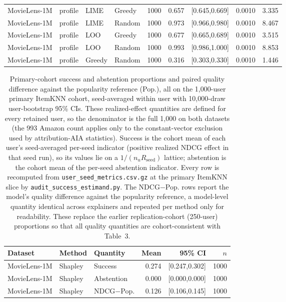 \begin{table}[!htbp]
\begin{tabular}{@{}llllrrrrr@{}}
MovieLens-1M & profile & LIME & Greedy & 1000 & 0.657 & [0.645,0.669] & 0.0010 & 3.335 \\
MovieLens-1M & profile & LIME & Random & 1000 & 0.973 & [0.966,0.980] & 0.0010 & 8.467 \\
MovieLens-1M & profile & LOO & Greedy & 1000 & 0.677 & [0.665,0.689] & 0.0010 & 3.515 \\
MovieLens-1M & profile & LOO & Random & 1000 & 0.993 & [0.986,1.000] & 0.0010 & 8.853 \\
MovieLens-1M & profile & Greedy & Random & 1000 & 0.316 & [0.303,0.330] & 0.0010 & 1.446 \\
\bottomrule
\end{tabular}
\end{table}

\begin{table}[!htbp]\centering\scriptsize\setlength{\tabcolsep}{3pt}
\caption{Primary-cohort success and abstention proportions and paired
quality difference against the popularity reference (Pop.), all on the
1,000-user primary ItemKNN cohort, seed-averaged within user with
10,000-draw user-bootstrap 95\% CIs. These realized-effect quantities are
defined for every retained user, so the denominator is the full 1,000 on both
datasets (the 993 Amazon count applies only to the constant-vector exclusion
used by attribution-AIA statistics). Success is the cohort mean of each user's
seed-averaged per-seed indicator (positive realized NDCG effect in that seed run), so
its values lie on a $1/(n_uR_{\mathrm{seed}})$ lattice; abstention is the cohort
mean of the per-seed abstention indicator. Every row is recomputed from
\texttt{user\_seed\_metrics.csv.gz} at the primary ItemKNN slice by
\texttt{audit\_success\_estimand.py}. The NDCG$-$Pop. rows report the model's quality
difference against the popularity reference, a model-level quantity identical
across explainers and repeated per method only for readability. These replace
the earlier replication-cohort (250-user) proportions so that all quality
quantities are cohort-consistent with Table~3.}
\label{tab:prop-quality}
\begin{tabular}{@{}lllrrr@{}}
\toprule
Dataset & Method & Quantity & Mean & 95\% CI & $n$ \\
\midrule
MovieLens-1M & Shapley & Success & 0.274 & [0.247,0.302] & 1000 \\
MovieLens-1M & Shapley & Abstention & 0.000 & [0.000,0.000] & 1000 \\
MovieLens-1M & Shapley & NDCG$-$Pop. & 0.126 & [0.106,0.145] & 1000 \\

\end{tabular}
\end{table}
